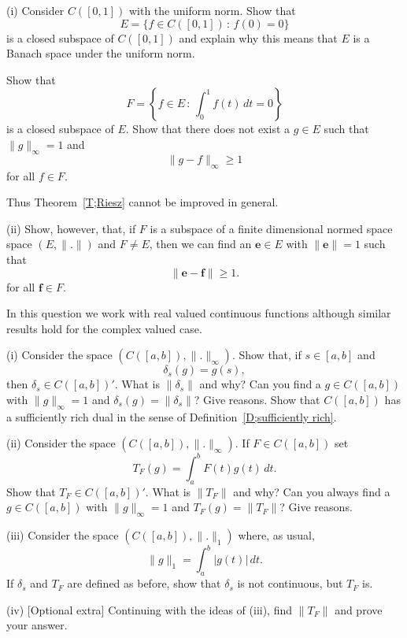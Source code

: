 \begin{exercise}\label{C1.6} (i) Consider $C([0,1])$ with the uniform norm.
Show that
\[E=\{f\in C([0,1])\,:\,f(0)=0\}\]
is a closed subspace of $C([0,1])$ and explain why this
means that $E$ is a Banach space under the uniform norm.

Show that
\[F=\left\{f\in E\,:\,\int_{0}^{1}f(t)\,dt=0\right\}\]
is a closed subspace of $E$. Show that there does
not exist a $g\in E$ such that $\|g\|_{\infty}=1$
and 
\[\|g-f\|_{\infty}\geq 1\]
for all $f\in F$.

Thus Theorem~\ref{T;Riesz} cannot be improved
in general.

(ii) Show, however, that,
if $F$ is a subspace of a  finite dimensional
normed space space $(E,\|.\|)$
and $F\neq E$, then we can find
an ${\mathbf e}\in E$ with $\|{\mathbf e}\|=1$ such that
\[\|{\mathbf e}- {\mathbf f}\|\geq 1.\]
for all ${\mathbf f}\in F$.
\end{exercise}
\begin{exercise}\label{E;some dual continuous}\label{C1.7} 
In this question we work with real valued continuous functions although
similar results hold for the complex valued case.

(i) Consider the space $(C([a,b]),\|.\|_{\infty})$.
Show that, if $s\in[a,b]$ and
\[\delta_{s}(g)=g(s),\]
then $\delta_{s}\in  C([a,b])'$. What is $\|\delta_{s}\|$
and why? Can you find a $g\in C([a,b])$ with 
$\|g\|_{\infty}=1$ and $\delta_{s}(g)=\|\delta_{s}\|$?
Give reasons.
Show that $C([a,b])$ has a sufficiently rich dual in the sense of
Definition~\ref{D;sufficiently rich}.

(ii) Consider the space $(C([a,b]),\|.\|_{\infty})$.
If $F\in C([a,b])$ set
\[T_{F}(g)=\int_{a}^{b}F(t)g(t)\,dt.\]
Show that $T_{F}\in  C([a,b])'$. What is $\|T_{F}\|$
and why? Can you always find a $g\in C([a,b])$ with 
$\|g\|_{\infty}=1$ and $T_{F}(g)=\|T_{F}\|$?
Give reasons.

(iii) Consider the space $(C([a,b]),\|.\|_{1})$
where, as usual,
\[\|g\|_{1}=\int_{a}^{b}|g(t)|\,dt.\]
If $\delta_{s}$ and $T_{F}$ are defined as before, show that
$\delta_{s}$ is not continuous, but $T_{F}$ is.

(iv) [Optional extra] Continuing with the ideas of (iii),
find  $\|T_{F}\|$ and prove your answer.
\end{exercise}
